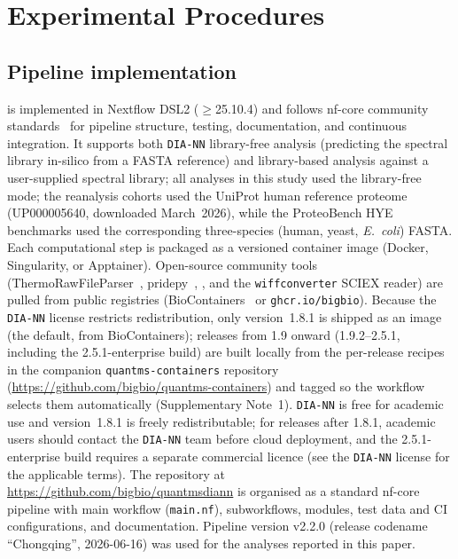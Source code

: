 \documentclass[preprint,12pt]{elsarticle}
\begin{document}
\section{Experimental Procedures}
\label{sec:methods}
\subsection{Pipeline implementation}
\label{sec:impl}

\quantmsdiann{} is implemented in Nextflow DSL2 ($\geq$25.10.4) and follows nf-core community standards~\cite{ewels2020nfcore} for pipeline structure, testing, documentation, and continuous integration. It supports both \texttt{DIA-NN} library-free analysis (predicting the spectral library in-silico from a FASTA reference) and library-based analysis against a user-supplied spectral library; all analyses in this study used the library-free mode; the reanalysis cohorts used the UniProt human reference proteome~\cite{uniprot2025} (UP000005640, downloaded March~2026), while the ProteoBench HYE benchmarks used the corresponding three-species (human, yeast, \textit{E.\ coli}) FASTA. Each computational step is packaged as a versioned container image (Docker, Singularity, or Apptainer). Open-source community tools (ThermoRawFileParser~\cite{hulstaert2020}, pridepy~\cite{kamatchinathan2025pridepy}, \qpx{}, and the \texttt{wiffconverter} SCIEX reader) are pulled from public registries (BioContainers~\cite{biocontainers2017} or \texttt{ghcr.io/bigbio}).
Because the \texttt{DIA-NN} license restricts redistribution, only version~1.8.1 is shipped as an image (the default, from BioContainers); releases from 1.9 onward (1.9.2--2.5.1, including the 2.5.1-enterprise build) are built locally from the per-release recipes in the companion \texttt{quantms-containers} repository (\url{https://github.com/bigbio/quantms-containers}) and tagged so the workflow selects them automatically (Supplementary Note~1). \texttt{DIA-NN} is free for academic use and version~1.8.1 is freely redistributable; for releases after 1.8.1, academic users should contact the \texttt{DIA-NN} team before cloud deployment, and the 2.5.1-enterprise build requires a separate commercial licence (see the \texttt{DIA-NN} license for the applicable terms). The repository at \url{https://github.com/bigbio/quantmsdiann} is organised as a standard nf-core pipeline with main workflow (\texttt{main.nf}), subworkflows, modules, test data and CI configurations, and documentation. Pipeline version v2.2.0 (release codename ``Chongqing'', 2026-06-16) was used for the analyses reported in this paper.
\end{document}
